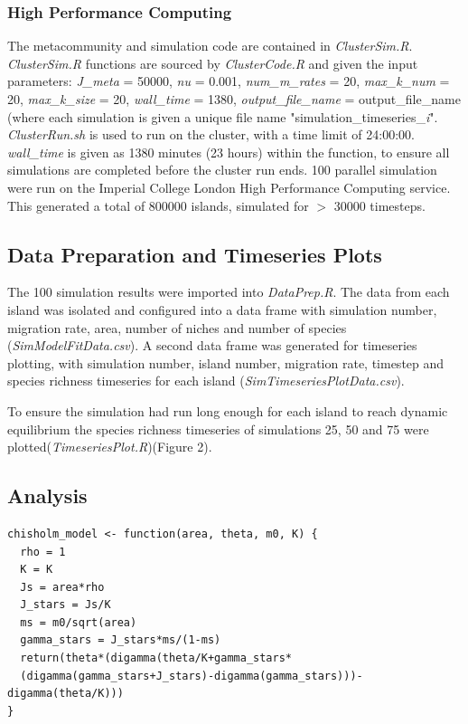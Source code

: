 \documentclass{article}
\begin{document}
\subsubsection{High Performance Computing}
The metacommunity and simulation code are contained in \textit{ClusterSim.R}. \textit{ClusterSim.R} functions are sourced by \textit{ClusterCode.R} and given the input parameters: \textit{J\_meta} = 50000, \textit{nu} = 0.001, \textit{num\_m\_rates} = 20, \textit{max\_k\_num} = 20, \textit{max\_k\_size} = 20, \textit{wall\_time} = 1380, \textit{output\_file\_name} = output\_file\_name (where each simulation is given a unique file name "simulation\_timeseries\_\textit{i}". \textit{ClusterRun.sh} is used to run on the cluster, with a time limit of 24:00:00. \textit{wall\_time} is given as 1380 minutes (23 hours) within the function, to ensure all simulations are completed before the cluster run ends. 100 parallel simulation were run on the Imperial College London High Performance Computing service. This generated a total of 800000 islands, simulated for $>$ 30000 timesteps.   

\subsection{Data Preparation and Timeseries Plots}
The 100 simulation results were imported into \textit{DataPrep.R}. The data from each island was isolated and configured into a data frame with simulation number, migration rate, area, number of niches and number of species (\textit{SimModelFitData.csv}). A second data frame was generated for timeseries plotting, with simulation number, island number, migration rate, timestep and species richness timeseries for each island (\textit{SimTimeseriesPlotData.csv}).\bigskip

\noindent To ensure the simulation had run long enough for each island to reach dynamic equilibrium the species richness timeseries of simulations 25, 50 and 75 were plotted(\textit{TimeseriesPlot.R})(Figure 2).

\subsection{Analysis}\bigskip

\begin{verbatim}
chisholm_model <- function(area, theta, m0, K) {
  rho = 1
  K = K
  Js = area*rho
  J_stars = Js/K
  ms = m0/sqrt(area)
  gamma_stars = J_stars*ms/(1-ms)
  return(theta*(digamma(theta/K+gamma_stars*
  (digamma(gamma_stars+J_stars)-digamma(gamma_stars)))-digamma(theta/K)))
}
\end{verbatim}
\end{document}
